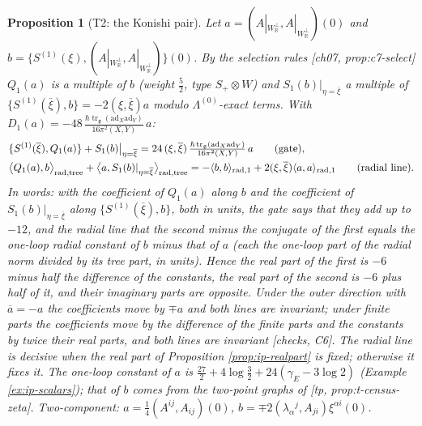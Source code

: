 \documentclass[11pt]{report}
\theoremstyle{plain}
\newtheorem{proposition}[theorem]{Proposition}
\theoremstyle{definition}
\numberwithin{equation}{chapter}
\newcommand{\unit}{\tfrac{\hbar\operatorname{tr}_{\mathfrak g}(\mathrm{ad}_X\mathrm{ad}_Y)}{16\pi^2(X,Y)}}
\newcommand{\Wp}{W_{\mathbb R}^\perp}
\newcommand{\rad}{{\rm rad}}
\newcommand{\Ko}{(A|_{\Wp},A|_{\Wp})}
\begin{document}
\begin{proposition}[T2: the Konishi pair]
\label{prop:ip-konishi}
Let $a=\Ko(0)$ and $b=\{S^{(1)}(\xi),\Ko\}(0)$. By the selection rules [ch07, prop:c7-select] $Q_1(a)$ is a multiple of $b$ (weight $\tfrac52$, type $S_+\otimes W$) and $S_1(b)|_{\eta=\overline\xi}$ a multiple of $\{S^{(1)}(\overline\xi),b\}=-2(\xi,\overline\xi)a$ modulo $\Lambda^{(0)}$-exact terms. With $D_1(a)=-48\,\unit\,a$:
\begin{equation}
\begin{aligned}
&\{S^{(1)}(\overline\xi),Q_1(a)\}+S_1(b)\big|_{\eta=\overline\xi}=24\,(\xi,\overline\xi)\,\unit\,a\qquad\text{(gate)},\\
&\big\langle Q_1(a),b\big\rangle_{\rad,{\rm tree}}+\big\langle a,S_1(b)|_{\eta=\overline\xi}\big\rangle_{\rad,{\rm tree}}=-\langle b,b\rangle_{\rad,1}+2(\xi,\overline\xi)\langle a,a\rangle_{\rad,1}\qquad\text{(radial line)}.
\end{aligned}
\label{eq:ip-konishi}
\end{equation}
In words: with the coefficient of $Q_1(a)$ along $b$ and the coefficient of $S_1(b)|_{\eta=\overline\xi}$ along $\{S^{(1)}(\overline\xi),b\}$, both in units, the gate says that they add up to $-12$, and the radial line that the second minus the conjugate of the first equals the one-loop radial constant of $b$ minus that of $a$ (each the one-loop part of the radial norm divided by its tree part, in units). Hence the real part of the first is $-6$ minus half the difference of the constants, the real part of the second is $-6$ plus half of it, and their imaginary parts are opposite. Under the outer direction with $\overline a=-a$ the coefficients move by $\mp a$ and both lines are invariant; under finite parts the coefficients move by the difference of the finite parts and the constants by twice their real parts, and both lines are invariant [checks, C6]. The radial line is decisive when the real part of Proposition \ref{prop:ip-realpart} is fixed; otherwise it fixes it. The one-loop constant of $a$ is $\tfrac{27}2+4\log\tfrac32+24(\gamma_E-3\log2)$ (Example \ref{ex:ip-scalars}); that of $b$ comes from the two-point graphs of [tp, prop:t-census-zeta]. Two-component: $a=\tfrac14(A^{ij},A_{ij})(0)$, $b=\mp2(\lambda_\alpha{}^j,A_{ji})\xi^{\alpha i}(0)$.
\end{proposition}
\end{document}
